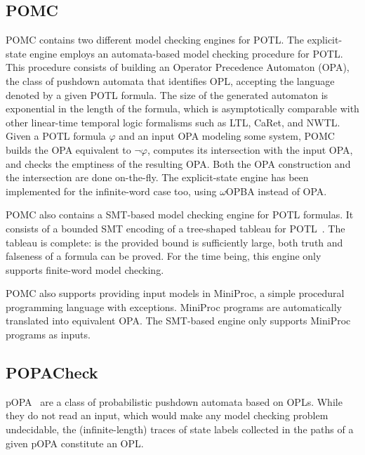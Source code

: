 \documentclass[9pt,a4paper]{article}
\begin{document}
\subsection{POMC}

POMC contains two different model checking engines for POTL.
The explicit-state engine employs an automata-based model checking procedure for POTL.
This procedure consists of building an Operator Precedence Automaton (OPA),
the class of pushdown automata that identifies OPL,
accepting the language denoted by a given POTL formula.
The size of the generated automaton is exponential in the length of the formula,
which is asymptotically comparable with other linear-time temporal logic
formalisms such as LTL, CaRet, and NWTL.
Given a POTL formula $\varphi$ and an input OPA modeling some system,
POMC builds the OPA equivalent to $\neg \varphi$, computes its intersection
with the input OPA, and checks the emptiness of the resulting OPA.
Both the OPA construction and the intersection are done on-the-fly.
The explicit-state engine has been implemented
for the infinite-word case too, using $\omega$OPBA instead of OPA.

POMC also contains a SMT-based model checking engine for POTL formulas.
It consists of a bounded SMT encoding of a tree-shaped tableau for POTL~\cite{ChiariGGP24}.
The tableau is complete: is the provided bound is sufficiently large,
both truth and falseness of a formula can be proved.
For the time being, this engine only supports finite-word model checking.

POMC also supports providing input models in MiniProc,
a simple procedural programming language with exceptions.
MiniProc programs are automatically translated into equivalent OPA.
The SMT-based engine only supports MiniProc programs as inputs.

\subsection{POPACheck}

pOPA~\cite{abs-2404-03515} are a class of probabilistic pushdown automata based on OPLs.
While they do not read an input, which would make any model checking problem undecidable,
the (infinite-length) traces of state labels collected in the paths of a given pOPA constitute an OPL.
\end{document}
